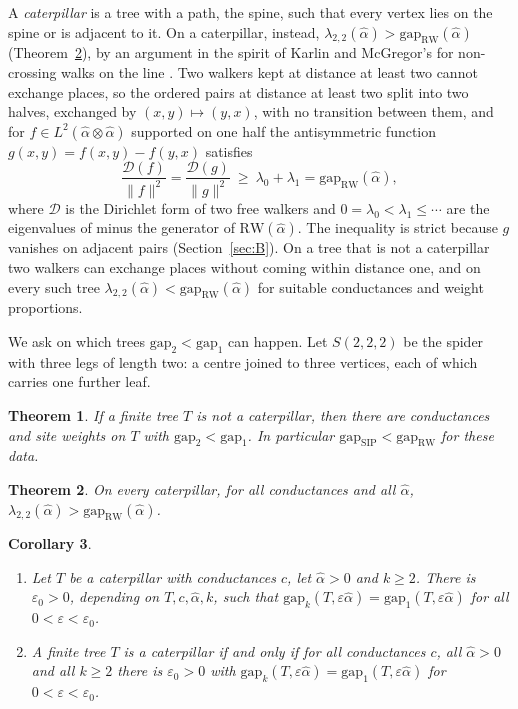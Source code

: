 \documentclass[11pt]{article}
\newtheorem{theorem}{Theorem}
\newtheorem{corollary}[theorem]{Corollary}
\theoremstyle{remark}
\newcommand{\gap}{\mathrm{gap}}
\newcommand{\RW}{\mathrm{RW}}
\newcommand{\eps}{\varepsilon}
\begin{document}
A \emph{caterpillar} is a tree with a path, the spine, such that every vertex lies on the spine or is adjacent to it. On a caterpillar, instead, $\lambda_{2,2}(\hat\alpha)>\gap_{\RW}(\hat\alpha)$ (Theorem~\ref{thm:B}), by an argument in the spirit of Karlin and McGregor's for non-crossing walks on the line \cite{KM59}. Two walkers kept at distance at least two cannot exchange places, so the ordered pairs at distance at least two split into two halves, exchanged by $(x,y)\mapsto(y,x)$, with no transition between them, and for $f\in L^2(\hat\alpha\otimes\hat\alpha)$ supported on one half the antisymmetric function $g(x,y)=f(x,y)-f(y,x)$ satisfies
\[
\frac{\mathcal D(f)}{\|f\|^2}=\frac{\mathcal D(g)}{\|g\|^2}\ \ge\ \lambda_0+\lambda_1=\gap_{\RW}(\hat\alpha),
\]
where $\mathcal D$ is the Dirichlet form of two free walkers and $0=\lambda_0<\lambda_1\le\cdots$ are the eigenvalues of minus the generator of $\RW(\hat\alpha)$. The inequality is strict because $g$ vanishes on adjacent pairs (Section~\ref{sec:B}). On a tree that is not a caterpillar two walkers can exchange places without coming within distance one, and on every such tree $\lambda_{2,2}(\hat\alpha)<\gap_{\RW}(\hat\alpha)$ for suitable conductances and weight proportions.

We ask on which trees $\gap_2<\gap_1$ can happen. Let $S(2,2,2)$ be the spider with three legs of length two: a centre joined to three vertices, each of which carries one further leaf.

\begin{theorem}\label{thm:A}
If a finite tree $T$ is not a caterpillar, then there are conductances and site weights on $T$ with $\gap_2<\gap_1$. In particular $\gap_{\mathrm{SIP}}<\gap_{\RW}$ for these data.
\end{theorem}

\begin{theorem}\label{thm:B}
On every caterpillar, for all conductances and all $\hat\alpha$, $\lambda_{2,2}(\hat\alpha)>\gap_{\RW}(\hat\alpha)$.
\end{theorem}

\begin{corollary}\label{cor:C}
\begin{enumerate}
\item[(a)] Let $T$ be a caterpillar with conductances $c$, let $\hat\alpha>0$ and $k\ge2$. There is $\eps_0>0$, depending on $T,c,\hat\alpha,k$, such that $\gap_k(T,\eps\hat\alpha)=\gap_1(T,\eps\hat\alpha)$ for all $0<\eps<\eps_0$.
\item[(b)] A finite tree $T$ is a caterpillar if and only if for all conductances $c$, all $\hat\alpha>0$ and all $k\ge2$ there is $\eps_0>0$ with $\gap_k(T,\eps\hat\alpha)=\gap_1(T,\eps\hat\alpha)$ for $0<\eps<\eps_0$.
\end{enumerate}
\end{corollary}
\end{document}
